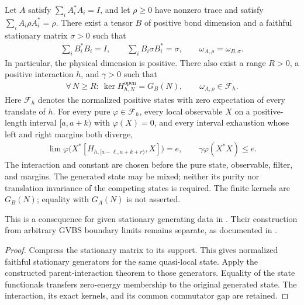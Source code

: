 \begin{lemma}
    \label{thm:stationary_generators_parent_interaction_gap}
    \leanok
    Let $A$ satisfy $\sum_i A_i^*A_i=I$, and let $\rho\geq0$ have
    nonzero trace and satisfy $\sum_i A_i\rho A_i^*=\rho$.
    There exist a tensor $B$ of positive bond dimension and a faithful
    stationary matrix $\sigma>0$ such that
    \begin{align}
        \sum_i B_i^*B_i=I,
        \qquad \sum_i B_i\sigma B_i^*=\sigma,
        \qquad \omega_{A,\rho}=\omega_{B,\sigma}.
    \end{align}
    In particular, the physical dimension is positive. There also exist
    a range $R>0$, a positive interaction $h$, and $\gamma>0$ such that
    \begin{align}
        \forall\,N\geq R:\ \ker H^{\mathrm{open}}_{h,N}=G_B(N),
        \qquad \omega_{A,\rho}\in\mathcal F_h.
    \end{align}
    Here $\mathcal F_h$ denotes the normalized positive states with zero
    expectation of every translate of $h$. For every pure
    $\varphi\in\mathcal F_h$, every local observable $X$ on a
    positive-length interval $[a,a+k)$ with $\varphi(X)=0$, and every
    interval exhaustion whose left and right margins both diverge,
    \begin{align}
        \lim \varphi\bigl(X^*[H_{h,[a-\ell,a+k+r)},X]\bigr)=e,
        \qquad \gamma\varphi(X^*X)\leq e.
    \end{align}
    The interaction and constant are chosen before the pure state,
    observable, filter, and margins. The generated state may be mixed;
    neither its purity nor translation invariance of the competing
    states is required. The finite kernels are $G_B(N)$; equality with
    $G_A(N)$ is not asserted.

    This is a consequence for given stationary generating data in
    \cite[Section~3]{Nachtergaele1996Spectral}. Their construction from
    arbitrary GVBS boundary limits remains separate, as documented in
    \cite{gap:nachtergaele96_infinite_volume_ground_projection}.
\end{lemma}
\begin{proof}\leanok
    Compress the stationary matrix to its support. This gives normalized
    faithful stationary generators for the same quasi-local state.
    Apply the constructed parent-interaction theorem to those generators.
    Equality of the state functionals transfers zero-energy membership
    to the original generated state. The interaction, its exact kernels,
    and its common commutator gap are retained.
\end{proof}


